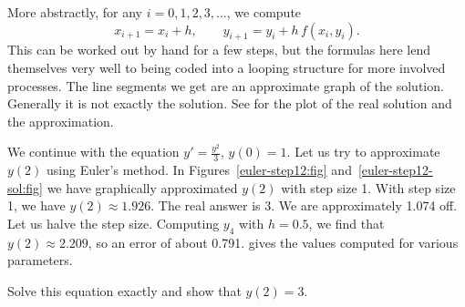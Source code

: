\documentclass{ximera}
\begin{document}
\begin{myfig}
    \capstart
    \caption{First two steps of Euler's method with $h=1$ for the equation $y' = \frac{y^2}{3}$ with initial conditions $y(0)=1$.%
    \label{euler-step12:fig}}
\end{myfig}

More abstractly, for any $i=0,1,2,3,\ldots$, we compute
\begin{equation*}
    x_{i+1} = x_i + h , \qquad y_{i+1}  = y_i + h\, f(x_i,y_i) .
\end{equation*}
This can be worked out by hand for a few steps, but the formulas here lend themselves very well to being coded into a looping structure for more involved processes. The line segments we get are an approximate graph of the solution. Generally it is not exactly the solution.  See  for the plot of the real solution and the approximation.

\begin{myfig}
    \capstart
    \caption{Two steps of Euler's method (step size 1) and the exact solution for the equation $y' = \frac{y^2}{3}$ with initial conditions $y(0)=1$.
    \label{euler-step12-sol:fig}}
\end{myfig}

We continue with the equation $y' = \frac{y^2}{3}$, $y(0)=1$. Let us try to approximate $y(2)$ using Euler's method.  In Figures~\ref{euler-step12:fig} and~\ref{euler-step12-sol:fig} we have  graphically approximated $y(2)$ with step size 1.  With step size 1, we have $y(2) \approx 1.926$.  The real answer is 3.  We are approximately 1.074 off.  Let us halve the step size.
Computing $y_4$ with $h=0.5$, we find that $y(2) \approx 2.209$, so an error of about 0.791.  gives the values computed for various parameters.

\begin{exercise}
    Solve this equation exactly and show that $y(2) = 3$.
\end{exercise}
\end{document}
